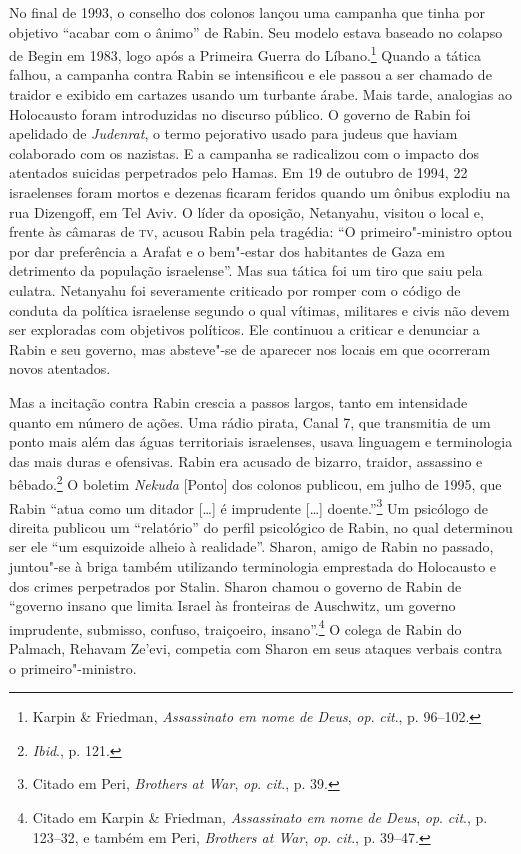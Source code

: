 No final de 1993, o conselho dos colonos lançou uma campanha que tinha por objetivo
``acabar com o ânimo'' de Rabin. Seu modelo estava baseado no colapso de
Begin em 1983, logo após a Primeira Guerra do Líbano.\footnote{Karpin \& Friedman, \emph{Assassinato em nome de Deus},
\emph{op}. \emph{cit}., p. 96--102.} Quando
a tática falhou, a campanha contra Rabin se intensificou e ele passou a
ser chamado de traidor e exibido em cartazes usando um turbante árabe.
Mais tarde, analogias ao Holocausto foram introduzidas no discurso
público. O governo de Rabin foi apelidado de \emph{Judenrat}, o termo
pejorativo usado para judeus que haviam colaborado com os nazistas. E a
campanha se radicalizou com o impacto dos atentados suicidas perpetrados
pelo Hamas. Em 19 de outubro de 1994, 22 israelenses foram
mortos e dezenas ficaram feridos quando um ônibus explodiu na rua Dizengoff, em
Tel Aviv. O líder da oposição, Netanyahu, visitou o local e, frente às
câmaras de \textsc{tv}, acusou Rabin pela tragédia: ``O primeiro"-ministro optou
por dar preferência a Arafat e o bem"-estar dos habitantes de Gaza em
detrimento da população israelense''. Mas sua tática foi um tiro que
saiu pela culatra. Netanyahu foi severamente criticado por romper com o
código de conduta da política israelense segundo o qual vítimas,
militares e civis não devem ser exploradas com objetivos políticos. Ele
continuou a criticar e denunciar a Rabin e seu governo, mas absteve"-se
de aparecer nos locais em que ocorreram novos atentados.

Mas a incitação contra Rabin crescia a passos largos, tanto em
intensidade quanto em número de ações. Uma rádio pirata, Canal 7, que
transmitia de um ponto mais além das águas territoriais israelenses,
usava linguagem e terminologia das mais duras e ofensivas. Rabin era
acusado de bizarro, traidor, assassino e bêbado.\footnote{\emph{Ibid}., p. 121.} O
boletim \emph{Nekuda} {[}Ponto{]} dos colonos publicou, em julho de 1995, que Rabin
``atua como um ditador {[}\ldots{}{]} é imprudente {[}\ldots{}{]} doente.''\footnote{Citado em Peri, \emph{Brothers at War}, \emph{op}. \emph{cit}., p. 39.} Um
psicólogo de direita publicou um ``relatório'' do perfil psicológico de
Rabin, no qual determinou ser ele ``um esquizoide alheio à realidade''.
Sharon, amigo de Rabin no passado, juntou"-se à briga também utilizando
terminologia emprestada do Holocausto e dos crimes perpetrados por
Stalin. Sharon chamou o governo de Rabin de ``governo insano que limita
Israel às fronteiras de Auschwitz, um governo imprudente, submisso,
confuso, traiçoeiro, insano''.\footnote{Citado em Karpin \& Friedman, \emph{Assassinato em nome de Deus}, \emph{op}. \emph{cit}., p. 123--32, e também em Peri, 
\emph{Brothers at War}, \emph{op}. \emph{cit}., p. 39--47.} O colega de Rabin do Palmach, Rehavam Ze'evi, competia com Sharon em seus ataques verbais contra o
primeiro"-ministro.

